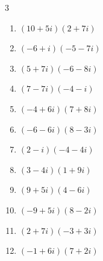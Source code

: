 \begin{multicols}{3}
\begin{enumerate}
        \phantom{$\displaystyle =-110+30i$}

  \item $\displaystyle (10+5i)(2+7i)$

        \phantom{$\displaystyle =-15+80i$}

  \item $\displaystyle (-6+i)(-5-7i)$

        \phantom{$\displaystyle =37+37i$}

  \item $\displaystyle (5+7i)(-6-8i)$

        \phantom{$\displaystyle =26-82i$}

  \item $\displaystyle (7-7i)(-4-i)$

        \phantom{$\displaystyle =-35+21i$}

  \item $\displaystyle (-4+6i)(7+8i)$

        \phantom{$\displaystyle =-76+10i$}

  \item $\displaystyle (-6-6i)(8-3i)$

        \phantom{$\displaystyle =-66-30i$}

\columnbreak %

\resetques

  \item $\displaystyle (2-i)(-4-4i)$

        \phantom{$\displaystyle =-12-4i$}

  \item $\displaystyle (3-4i)(1+9i)$

        \phantom{$\displaystyle =39+23i$}

  \item $\displaystyle (9+5i)(4-6i)$

        \phantom{$\displaystyle =66-34i$}

  \item $\displaystyle (-9+5i)(8-2i)$

        \phantom{$\displaystyle =-62+58i$}

  \item $\displaystyle (2+7i)(-3+3i)$

        \phantom{$\displaystyle =-27-15i$}

  \item $\displaystyle (-1+6i)(7+2i)$

        \phantom{$\displaystyle =-19+40i$}


\end{enumerate}
\end{multicols}
